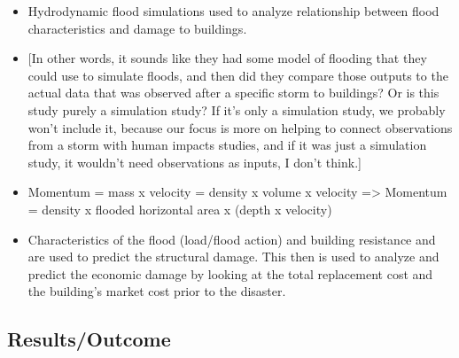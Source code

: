 \documentclass[
]{article}
\begin{document}
\begin{itemize}
\item
  Hydrodynamic flood simulations used to analyze relationship between
  flood characteristics and damage to buildings.
\item
  {[}In other words, it sounds like they had some model of flooding that
  they could use to simulate floods, and then did they compare those
  outputs to the actual data that was observed after a specific storm to
  buildings? Or is this study purely a simulation study? If it's only a
  simulation study, we probably won't include it, because our focus is
  more on helping to connect observations from a storm with human
  impacts studies, and if it was just a simulation study, it wouldn't
  need observations as inputs, I don't think.{]}
\item
  Momentum = mass x velocity = density x volume x velocity
  =\textgreater{} Momentum = density x flooded horizontal area x (depth
  x velocity)
\item
  Characteristics of the flood (load/flood action) and building
  resistance and are used to predict the structural damage. This then is
  used to analyze and predict the economic damage by looking at the
  total replacement cost and the building's market cost prior to the
  disaster.
\end{itemize}

\hypertarget{resultsoutcome-3}{%
\subsection{Results/Outcome}\label{resultsoutcome-3}}
\end{document}
